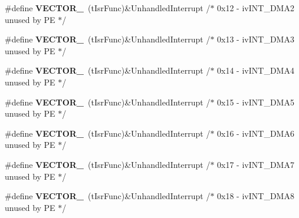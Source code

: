 \begin{DoxyCompactItemize}
\item 
\#define {\bfseries V\+E\+C\+T\+O\+R\+\_}~(t\+Isr\+Func)\&Unhandled\+Interrupt         /$\ast$ 0x12 -\/    iv\+I\+N\+T\+\_\+\+D\+M\+A2                     unused by P\+E $\ast$/\hypertarget{group___vectors___config__module_ga2cfb8a764241bd252c9020ba0526e96f}{}\label{group___vectors___config__module_ga2cfb8a764241bd252c9020ba0526e96f}

\item 
\#define {\bfseries V\+E\+C\+T\+O\+R\+\_}~(t\+Isr\+Func)\&Unhandled\+Interrupt         /$\ast$ 0x13 -\/    iv\+I\+N\+T\+\_\+\+D\+M\+A3                     unused by P\+E $\ast$/\hypertarget{group___vectors___config__module_ga8aac991317db9701b4cbc7b1dd6c7098}{}\label{group___vectors___config__module_ga8aac991317db9701b4cbc7b1dd6c7098}

\item 
\#define {\bfseries V\+E\+C\+T\+O\+R\+\_}~(t\+Isr\+Func)\&Unhandled\+Interrupt         /$\ast$ 0x14 -\/    iv\+I\+N\+T\+\_\+\+D\+M\+A4                     unused by P\+E $\ast$/\hypertarget{group___vectors___config__module_gaeab1edc4c68b12ab81cac270c6778534}{}\label{group___vectors___config__module_gaeab1edc4c68b12ab81cac270c6778534}

\item 
\#define {\bfseries V\+E\+C\+T\+O\+R\+\_}~(t\+Isr\+Func)\&Unhandled\+Interrupt         /$\ast$ 0x15 -\/    iv\+I\+N\+T\+\_\+\+D\+M\+A5                     unused by P\+E $\ast$/\hypertarget{group___vectors___config__module_ga9b8781351b79a3f7bdd5a95e49f7f3b1}{}\label{group___vectors___config__module_ga9b8781351b79a3f7bdd5a95e49f7f3b1}

\item 
\#define {\bfseries V\+E\+C\+T\+O\+R\+\_}~(t\+Isr\+Func)\&Unhandled\+Interrupt         /$\ast$ 0x16 -\/    iv\+I\+N\+T\+\_\+\+D\+M\+A6                     unused by P\+E $\ast$/\hypertarget{group___vectors___config__module_ga1e751fd5c4cb602c42a337b7a5ad2c4d}{}\label{group___vectors___config__module_ga1e751fd5c4cb602c42a337b7a5ad2c4d}

\item 
\#define {\bfseries V\+E\+C\+T\+O\+R\+\_}~(t\+Isr\+Func)\&Unhandled\+Interrupt         /$\ast$ 0x17 -\/    iv\+I\+N\+T\+\_\+\+D\+M\+A7                     unused by P\+E $\ast$/\hypertarget{group___vectors___config__module_gace8a735c2f3a513ea87163e4526d1245}{}\label{group___vectors___config__module_gace8a735c2f3a513ea87163e4526d1245}

\item 
\#define {\bfseries V\+E\+C\+T\+O\+R\+\_}~(t\+Isr\+Func)\&Unhandled\+Interrupt         /$\ast$ 0x18 -\/    iv\+I\+N\+T\+\_\+\+D\+M\+A8                     unused by P\+E $\ast$/\hypertarget{group___vectors___config__module_ga43a0def76f5510268e2aa36e13a9ee27}{}\label{group___vectors___config__module_ga43a0def76f5510268e2aa36e13a9ee27}


\end{DoxyCompactItemize}
